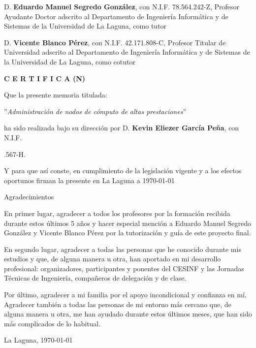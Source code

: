 \documentclass[spanish,a4paper,12pt,oneside]{extreport}
\begin{document}
D. {\bf Eduardo Manuel Segredo González}, con N.I.F. 78.564.242-Z, Profesor Ayudante Doctor adscrito al Departamento de Ingeniería Informática y de Sistemas de la Universidad de La Laguna, como tutor

\bigskip
D. {\bf Vicente Blanco Pérez}, con N.I.F. 42.171.808-C, Profesor Titular de Universidad adscrito al Departamento de Ingeniería Informática y de Sistemas de la Universidad de La Laguna, como cotutor\pagestyle{empty}

\bigskip
\bigskip
{\bf C E R T I F I C A (N)}

\bigskip
\bigskip
Que la presente memoria titulada:

\bigskip
''{\it Administración de nodos de cómputo de altas prestaciones}''

\bigskip
\bigskip
\bigskip

\noindent ha sido realizada bajo su dirección por D. {\bf Kevin Eliezer García Peña}, con N.I.F. 

.567-H.

\bigskip
\bigskip

Y para que así conste, en cumplimiento de la legislación vigente y a los efectos
oportunos firman la presente en La Laguna a \today

\newpage
\thispagestyle{empty}



{
\begin{flushright}
\begin{LARGE}
Agradecimientos
\end{LARGE}
\end{flushright}

\hspace{3mm}

En primer lugar, agradecer a todos los profesores por la formación recibida durante estos últimos 5 años y hacer especial mención a Eduardo Manuel Segredo González y Vicente Blanco Pérez por la tutorización y guía de este proyecto final.
\vspace{2mm}

En segundo lugar, agradecer a todas las personas que he conocido durante mis estudios y que, de alguna manera u otra, han aportado en mi desarrollo profesional: organizadores, participantes y ponentes del CESINF y las Jornadas Técnicas de Ingeniería, compañeros de delegación y de clase.

\vspace{2mm}

Por último, agradecer a mi familia por el apoyo incondicional y confianza en mí. Agradecer también a todas las personas de mi entorno más cercano que, de alguna manera u otra, me han ayudado durante estos últimos meses, que han sido más complicados de lo habitual.

\vspace{4mm}
La Laguna, \today
}
\end{document}
